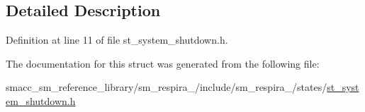 \subsection{Detailed Description}


Definition at line 11 of file st\+\_\+system\+\_\+shutdown.\+h.



The documentation for this struct was generated from the following file\+:\begin{DoxyCompactItemize}
\item 
smacc\+\_\+sm\+\_\+reference\+\_\+library/sm\+\_\+respira\+\_/include/sm\+\_\+respira\+\_/states/\hyperlink{st__system__shutdown_8h}{st\+\_\+system\+\_\+shutdown.\+h}\end{DoxyCompactItemize}
